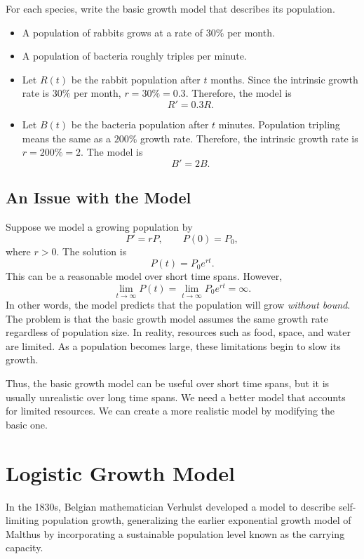 \documentclass[10pt,letterpaper]{article}
\begin{document}
\begin{example}[1]{
For each species, write the basic growth model that describes its population.
\begin{itemize}
    \item A population of rabbits grows at a rate of $30\%$ per
    month.

    \item A population of bacteria roughly triples per
    minute.
\end{itemize}
}

\begin{itemize}

\item Let $R(t)$ be the rabbit population after $t$ months. Since the intrinsic
growth rate is $30\%$ per month, $r=30\%=0.3$.
Therefore, the model is
\[
\boxed{
R'=0.3R.
}
\]

\item Let $B(t)$ be the bacteria population after $t$ minutes. Population tripling means the same as a $200\%$ growth rate. Therefore, the intrinsic growth rate is $r=200\%=2$. The model is
\[
\boxed{
B'=2B.
}
\]
\end{itemize}
\end{example}


\subsection{An Issue with the Model}

Suppose we model a growing population by
\[
P'=rP, \qquad P(0)=P_0,
\]
where $r>0$. The solution is
$$
P(t)=P_0e^{rt}.
$$
This can be a reasonable model over short time spans. However, 
\[
\lim_{t\to\infty}P(t)
=
\lim_{t\to\infty}P_0e^{rt}
=
\infty.
\]
In other words, the model predicts that the population will grow
\textit{without bound}. The problem is that the basic growth model assumes the same growth rate regardless of population size. In reality, resources such as food, space,
and water are limited. As a population becomes large, these limitations
begin to slow its growth.

Thus, the basic growth model can be useful over short time spans, but it is
usually unrealistic over long time spans. We need a better model that
accounts for limited resources. We can create a more realistic model by modifying the basic one.


\section{Logistic Growth Model}
In the 1830s, Belgian mathematician Verhulst developed a model to describe
self-limiting population growth, generalizing the earlier exponential growth
model of Malthus by incorporating a sustainable population level known as the
carrying capacity.
\end{document}
